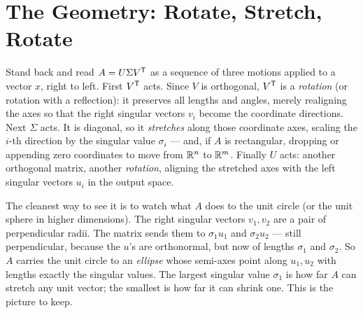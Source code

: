 
\section{The Geometry: Rotate, Stretch, Rotate}

Stand back and read $A=U\Sigma V^{\mathsf T}$ as a sequence of three motions applied to a vector $x$, right to left. First $V^{\mathsf T}$ acts. Since $V$ is orthogonal, $V^{\mathsf T}$ is a \emph{rotation} (or rotation with a reflection): it preserves all lengths and angles, merely realigning the axes so that the right singular vectors $v_i$ become the coordinate directions. Next $\Sigma$ acts. It is diagonal, so it \emph{stretches} along those coordinate axes, scaling the $i$-th direction by the singular value $\sigma_i$ --- and, if $A$ is rectangular, dropping or appending zero coordinates to move from $\mathbb{R}^n$ to $\mathbb{R}^m$. Finally $U$ acts: another orthogonal matrix, another \emph{rotation}, aligning the stretched axes with the left singular vectors $u_i$ in the output space.


The cleanest way to see it is to watch what $A$ does to the unit circle (or the unit sphere in higher dimensions). The right singular vectors $v_1,v_2$ are a pair of perpendicular radii. The matrix sends them to $\sigma_1 u_1$ and $\sigma_2 u_2$ --- still perpendicular, because the $u$'s are orthonormal, but now of lengths $\sigma_1$ and $\sigma_2$. So $A$ carries the unit circle to an \emph{ellipse} whose semi-axes point along $u_1,u_2$ with lengths exactly the singular values. The largest singular value $\sigma_1$ is how far $A$ can stretch any unit vector; the smallest is how far it can shrink one. This is the picture to keep.

